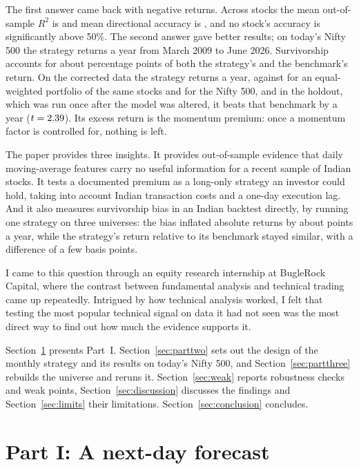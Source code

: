 \documentclass[11pt]{article}
\begin{document}
The first answer came back with negative returns. Across \NStocks{} stocks the mean out-of-sample $R^2$
is \RsqMean{} and mean directional accuracy is \AccMean, and no stock's accuracy is
significantly above 50\%. The second answer gave better results; on today's Nifty 500 the strategy returns \SurvCagrFull{} a
year from March 2009 to June 2026. Survivorship accounts for about \BiasRounded{}
percentage points of both the strategy's and the benchmark's return. On the
corrected data the strategy returns \PitCagrFull{} a year, against \PitEwCagrFull{}
for an equal-weighted portfolio of the same stocks and \PitNiftyCagrFull{} for the
Nifty 500, and in the holdout, which was run once after the model was altered, it
beats that benchmark by \PitActiveHold{} a year ($t = 2.39$). Its excess
return is the momentum premium: once a momentum factor is controlled for, nothing
is left.

The paper provides three insights. It provides out-of-sample evidence that daily
moving-average features carry no useful information for a recent sample of Indian
stocks. It tests a documented premium as a long-only strategy an investor could
hold, taking into account Indian transaction costs and a one-day execution lag. And it also measures survivorship bias in
an Indian backtest directly, by running one strategy on three universes: the bias
inflated absolute returns by about \BiasRounded{} points a year, while the strategy's return
relative to its benchmark stayed similar, with a difference of a few basis points.

I came to this question through an equity research internship at BugleRock
Capital, where the contrast between fundamental analysis and technical trading came
up repeatedly. Intrigued by how technical analysis worked, I felt that testing the most popular technical signal on data
it had not seen was the most direct way to find out how much the evidence supports it. 

Section~\ref{sec:partone} presents Part~I. Section~\ref{sec:parttwo} sets out the
design of the monthly strategy and its results on today's Nifty 500, and
Section~\ref{sec:partthree} rebuilds the universe and reruns it.
Section~\ref{sec:weak} reports robustness checks and weak points,
Section~\ref{sec:discussion} discusses the findings and Section~\ref{sec:limits}
their limitations. Section~\ref{sec:conclusion} concludes.

\section{Part I: A next-day forecast}\label{sec:partone}
\end{document}

